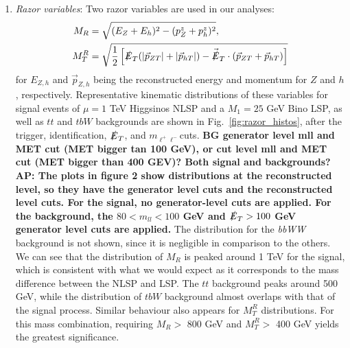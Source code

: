 \documentclass[a4paper,11pt]{article}
\newcommand{\Shufang}[1]{{\bf\color{Maroon}  #1}}
\newcommand{\Adarsh}[1]{{\bf\color{RoyalBlue} AP: #1}}
\newcommand{\met}{{\slashed{E}_T}}
\begin{document}
\begin{enumerate}
  \item \emph{Razor variables}:  Two razor variables are used in our analyses: 
\begin{align}
M_R &= \sqrt{(E_Z+E_h)^2 - (p_Z^z + p_h^z)^2},\\
M_T^R &= \sqrt{\frac{1}{2}\left[\slashed{E}_T(|\vec{p}_{ZT}|+|\vec{p}_{hT}|)
- \vec{\slashed{E}}_T\cdot(\vec{p}_{ZT}+\vec{p}_{hT})\right]}
\end{align}
 for $E_{Z,h}$ and $\vec{p}_{Z,h}$ being the reconstructed energy and momentum for $Z$ and $h$, respectively.
      Representative kinematic
  distributions of these variables for signal events of $\mu=1$ TeV Higgsinos
  NLSP and a $M_1=25$ GeV Bino LSP, as well as $tt$ and $tbW$ backgrounds are
  shown in Fig.~\ref{fig:razor_histos}, after the trigger, identification,
  $\slashed{E}_{T}$,  and  $m_{\ell^+\ell^-}$cuts.   
  \Shufang{BG generator level mll and MET cut (MET bigger tan 100 GeV), or cut
    level mll and MET cut (MET bigger than 400 GEV)? Both signal and
  backgrounds?} \Adarsh{The plots in figure 2 show distributions at the reconstructed level,
  so they have the generator level cuts and the reconstructed level cuts. 
  For the signal, no generator-level cuts are applied.
  For the background, the $80 < m_{ll} < 100 $ GeV and  $\met > 100$ GeV
  generator level cuts are applied.}
  The distribution for the \emph{bbWW} background is not shown, since it is negligible in
  comparison to the others.   We can see that the distribution of $M_R$ is peaked
  around 1 TeV for the signal, which is consistent with what we would expect as
  it corresponds to the mass difference between the NLSP and LSP.  The $tt$
  background peaks around 500 GeV, while the distribution of $tbW$ background
  almost overlaps with that of the signal process.  Similar behaviour also
  appears for $M_T^R$ distributions.  
  For this mass combination, requiring $M_R >$ 800
  GeV and $M_T^R >$ 400 GeV yields the greatest significance.

\end{enumerate}
\end{document}
